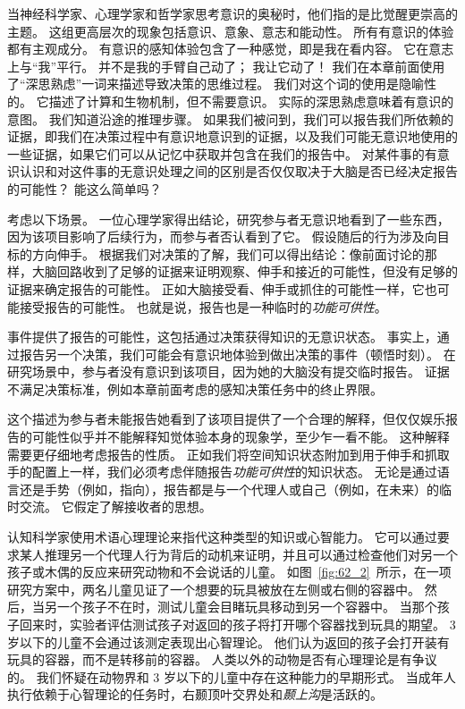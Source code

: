 当神经科学家、心理学家和哲学家思考意识的奥秘时，他们指的是比觉醒更崇高的主题。
这组更高层次的现象包括意识、意象、意志和能动性。
所有有意识的体验都有主观成分。
有意识的感知体验包含了一种感觉，即是我在看内容。
它在意志上与“我”平行。
并不是我的手臂自己动了；
我让它动了！
我们在本章前面使用了“深思熟虑”一词来描述导致决策的思维过程。
我们对这个词的使用是隐喻性的。
它描述了计算和生物机制，但不需要意识。
实际的深思熟虑意味着有意识的意图。
我们知道沿途的推理步骤。
如果我们被问到，我们可以报告我们所依赖的证据，即我们在决策过程中有意识地意识到的证据，以及我们可能无意识地使用的一些证据，如果它们可以从记忆中获取并包含在我们的报告中。
对某件事的有意识认识和对这件事的无意识处理之间的区别是否仅仅取决于大脑是否已经决定报告的可能性？
能这么简单吗？


考虑以下场景。
一位心理学家得出结论，研究参与者无意识地看到了一些东西，因为该项目影响了后续行为，而参与者否认看到了它。
假设随后的行为涉及向目标的方向伸手。
根据我们对决策的了解，我们可以得出结论：像前面讨论的那样，大脑回路收到了足够的证据来证明观察、伸手和接近的可能性，但没有足够的证据来确定报告的可能性。
正如大脑接受看、伸手或抓住的可能性一样，它也可能接受报告的可能性。
也就是说，报告也是一种临时的\textit{功能可供性}。


事件提供了报告的可能性，这包括通过决策获得知识的无意识状态。
事实上，通过报告另一个决策，我们可能会有意识地体验到做出决策的事件（顿悟时刻）。
在研究场景中，参与者没有意识到该项目，因为她的大脑没有提交临时报告。
证据不满足决策标准，例如本章前面考虑的感知决策任务中的终止界限。


这个描述为参与者未能报告她看到了该项目提供了一个合理的解释，但仅仅娱乐报告的可能性似乎并不能解释知觉体验本身的现象学，至少乍一看不能。
这种解释需要更仔细地考虑报告的性质。
正如我们将空间知识状态附加到用于伸手和抓取手的配置上一样，我们必须考虑伴随报告\textit{功能可供性}的知识状态。
无论是通过语言还是手势（例如，指向），报告都是与一个代理人或自己（例如，在未来）的临时交流。
它假定了解接收者的思想。


认知科学家使用术语心理理论来指代这种类型的知识或心智能力。
它可以通过要求某人推理另一个代理人行为背后的动机来证明，并且可以通过检查他们对另一个孩子或木偶的反应来研究动物和不会说话的儿童。
如图~\ref{fig:62_2}~所示，在一项研究方案中，两名儿童见证了一个想要的玩具被放在左侧或右侧的容器中。
然后，当另一个孩子不在时，测试儿童会目睹玩具移动到另一个容器中。
当那个孩子回来时，实验者评估测试孩子对返回的孩子将打开哪个容器找到玩具的期望。
3 岁以下的儿童不会通过该测定表现出心智理论。
他们认为返回的孩子会打开装有玩具的容器，而不是转移前的容器。
人类以外的动物是否有心理理论是有争议的。
我们怀疑在动物界和 3 岁以下的儿童中存在这种能力的早期形式。
当成年人执行依赖于心智理论的任务时，右颞顶叶交界处和\textit{颞上沟}是活跃的。


